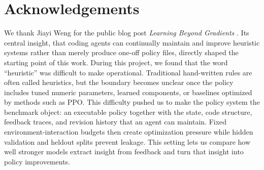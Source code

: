 \documentclass{article}
\begin{document}
\section*{Acknowledgements}
We thank Jiayi Weng for the public blog post \emph{Learning Beyond Gradients}
\citep{learningbeyondgradients}. Its central insight, that coding agents can
continually maintain and improve heuristic systems rather than merely produce
one-off policy files, directly shaped the starting point of this work. During
this project, we found that the word ``heuristic''
was difficult to make operational. Traditional hand-written rules are often
called heuristics, but the boundary becomes unclear once the policy includes
tuned numeric parameters, learned components, or baselines optimized by methods
such as PPO. This difficulty pushed us to make the policy system the benchmark
object: an executable policy together with the state, code structure, feedback
traces, and revision history that an agent can maintain. Fixed
environment-interaction budgets then create optimization pressure while hidden
validation and heldout splits prevent leakage. This setting lets us compare
how well stronger models extract insight from feedback and turn that insight
into policy improvements.





\end{document}
